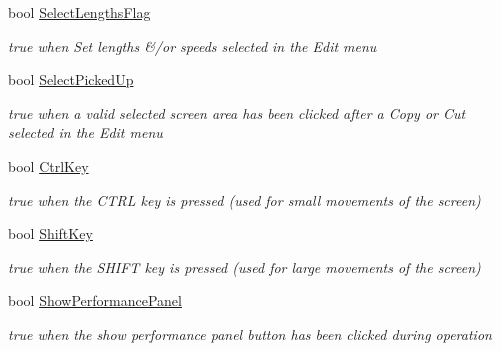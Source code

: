 \begin{DoxyCompactItemize}
bool \mbox{\hyperlink{class_t_interface_abecb64b29fef5bd8b3e8f38e94987dfb}{Select\+Lengths\+Flag}}
\begin{DoxyCompactList}\small\item\em true when \textquotesingle{}Set lengths \&/or speeds\textquotesingle{} selected in the \textquotesingle{}Edit\textquotesingle{} menu \end{DoxyCompactList}\item 
\mbox{\label{class_t_interface_a4f4ff98ecd060a4d85f77d92571cf1e4}} 
bool \mbox{\hyperlink{class_t_interface_a4f4ff98ecd060a4d85f77d92571cf1e4}{Select\+Picked\+Up}}
\begin{DoxyCompactList}\small\item\em true when a valid selected screen area has been clicked after a \textquotesingle{}Copy\textquotesingle{} or \textquotesingle{}Cut\textquotesingle{} selected in the \textquotesingle{}Edit\textquotesingle{} menu \end{DoxyCompactList}\item 
\mbox{\label{class_t_interface_afbb1365eba3ccd54462f24f85f459ab8}} 
bool \mbox{\hyperlink{class_t_interface_afbb1365eba3ccd54462f24f85f459ab8}{Ctrl\+Key}}
\begin{DoxyCompactList}\small\item\em true when the C\+T\+RL key is pressed (used for small movements of the screen) \end{DoxyCompactList}\item 
\mbox{\label{class_t_interface_a4fe6f9d78a513b65b597487a90ad41a8}} 
bool \mbox{\hyperlink{class_t_interface_a4fe6f9d78a513b65b597487a90ad41a8}{Shift\+Key}}
\begin{DoxyCompactList}\small\item\em true when the S\+H\+I\+FT key is pressed (used for large movements of the screen) \end{DoxyCompactList}\item 
\mbox{\label{class_t_interface_a9d0e89a8c2ee7c7fd2db3e8f2ca8eaa2}} 
bool \mbox{\hyperlink{class_t_interface_a9d0e89a8c2ee7c7fd2db3e8f2ca8eaa2}{Show\+Performance\+Panel}}
\begin{DoxyCompactList}\small\item\em true when the \textquotesingle{}show performance panel\textquotesingle{} button has been clicked during operation \end{DoxyCompactList}\item 

\end{DoxyCompactItemize}
